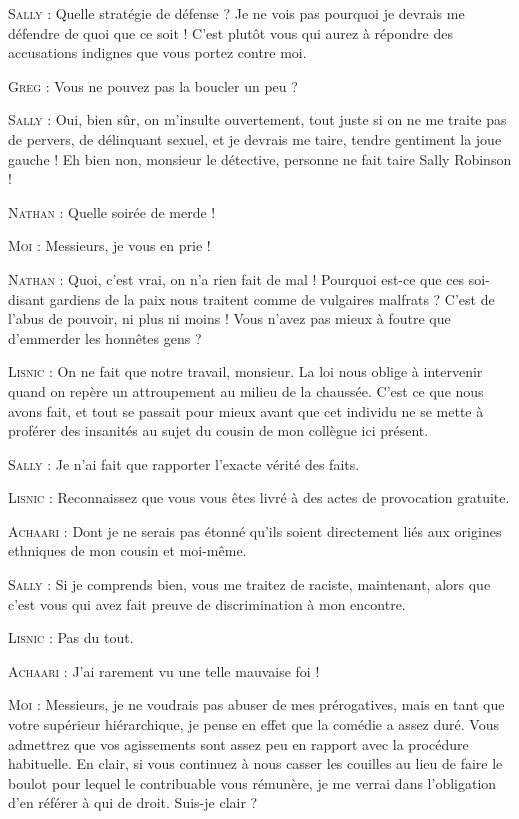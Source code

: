 \begin{dialogue}
\textsc{Sally} : Quelle stratégie de défense ? Je ne vois pas pourquoi je devrais me défendre de quoi que ce soit ! C’est plutôt vous qui aurez à répondre des accusations indignes que vous portez contre moi.

\textsc{Greg} : Vous ne pouvez pas la boucler un peu ?

\textsc{Sally} : Oui, bien sûr, on m’insulte ouvertement, tout juste si on ne me traite pas de pervers, de délinquant sexuel, et je devrais me taire, tendre gentiment la joue gauche ! Eh bien non, monsieur le détective, personne ne fait taire Sally Robinson !

\textsc{Nathan} : Quelle soirée de merde !

\textsc{Moi} : Messieurs, je vous en prie !

\textsc{Nathan} : Quoi, c’est vrai, on n’a rien fait de mal ! Pourquoi est-ce que ces soi-disant gardiens de la paix nous traitent comme de vulgaires malfrats ? C’est de l’abus de pouvoir, ni plus ni moins ! Vous n’avez pas mieux à foutre que d’emmerder les honnêtes gens ?

\textsc{Lisnic} : On ne fait que notre travail, monsieur. La loi nous oblige à intervenir quand on repère un attroupement au milieu de la chaussée. C’est ce que nous avons fait, et tout se passait pour mieux avant que cet individu ne se mette à proférer des insanités au sujet du cousin de mon collègue ici présent.

\textsc{Sally} : Je n’ai fait que rapporter l’exacte vérité des faits.

\textsc{Lisnic} : Reconnaissez que vous vous êtes livré à des actes de provocation gratuite.

\textsc{Achaari} : Dont je ne serais pas étonné qu’ils soient directement liés aux origines ethniques de mon cousin et moi-même.

\textsc{Sally} : Si je comprends bien, vous me traitez de raciste, maintenant, alors que c’est vous qui avez fait preuve de discrimination à mon encontre.

\textsc{Lisnic} : Pas du tout.

\textsc{Achaari} : J’ai rarement vu une telle mauvaise foi !

\textsc{Moi} : Messieurs, je ne voudrais pas abuser de mes prérogatives, mais en tant que votre supérieur hiérarchique, je pense en effet que la comédie a assez duré. Vous admettrez que vos agissements sont assez peu en rapport avec la procédure habituelle. En clair, si vous continuez à nous casser les couilles au lieu de faire le boulot pour lequel le contribuable vous rémunère, je me verrai dans l’obligation d’en référer à qui de droit. Suis-je clair ?


\end{dialogue}
